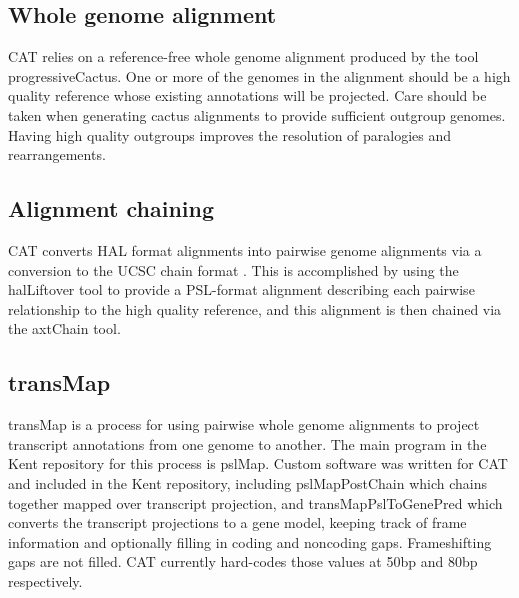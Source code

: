 \documentclass[fleqn,10pt]{wlscirep}
\begin{document}
\subsection*{Whole genome alignment}
	CAT relies on a reference-free whole genome alignment produced by the tool progressiveCactus. One or more of the genomes in the alignment should be a high quality reference whose existing annotations will be projected. Care should be taken when generating cactus alignments to provide sufficient outgroup genomes. Having high quality outgroups improves the resolution of paralogies and rearrangements.

\subsection*{Alignment chaining}
	CAT converts HAL format alignments into pairwise genome alignments via a conversion to the UCSC chain format \cite{kent2003evolution}. This is accomplished by using the halLiftover tool to provide a PSL-format alignment describing each pairwise relationship to the high quality reference, and this alignment is then chained via the axtChain tool. 
    
\subsection*{transMap}
	transMap \cite{stanke2008using,zhu2007comparative} is a process for using pairwise whole genome alignments to project transcript annotations from one genome to another. The main program in the Kent repository for this process is pslMap. Custom software was written for CAT and included in the Kent repository, including pslMapPostChain which chains together mapped over transcript projection, and transMapPslToGenePred which converts the transcript projections to a gene model, keeping track of frame information and optionally filling in coding and noncoding gaps. Frameshifting gaps are not filled. CAT currently hard-codes those values at 50bp and 80bp respectively.
    
\end{document}
